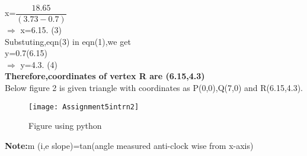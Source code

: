 \documentclass[a4paper,12pt]{article}
\begin{document}
x=$\dfrac{18.65}{(3.73-0.7)}$\\

$\Rightarrow$ x=6.15.\hspace*{3cm} (3)\\

Substuting,eqn(3) in eqn(1),we get\\

y=0.7(6.15)\\

$\Rightarrow$ y=4.3.\hspace*{3cm} (4)\\

\textbf{Therefore,coordinates of vertex R are (6.15,4.3)}\\

Below figure 2 is given triangle with coordinates as P(0,0),Q(7,0) and  \hspace*{0.5cm}R(6.15,4.3).\\
 
 \vspace*{2cm}
 
\begin{figure}[h]
\centering
\texttt{[image: Assignment5intrn2]}
\caption{Figure using python}
\end{figure}

\vspace*{4cm}
\textbf{Note:}m (i,e slope)=tan(angle measured anti-clock wise from x-axis)
\end{document}
